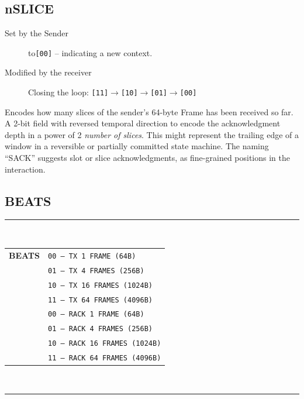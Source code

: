 \documentclass[../HFT-main.tex]{subfiles}
\begin{document}
\subsection{nSLICE}

\begin{description}
\item [Set by the Sender] to\texttt{[00]} --  indicating a  new context.
\item [Modified by the receiver] Closing the loop: \texttt{[11]$\rightarrow$[10]$\rightarrow$[01]$\rightarrow$[00]} %
\end{description}

Encodes how many slices of the sender’s 64-byte Frame has been received so far. A 2-bit field with reversed temporal direction to encode the acknowledgment depth in a power of 2 \emph{number of slices}. This might represent the trailing edge of a window in a reversible or partially committed state machine. The naming “SACK”  suggests  slot or slice acknowledgments, as fine-grained positions in the interaction. 


\subsection{BEATS}

\begin{margintable}
  \vspace{10pt} 
  \footnotesize
  \rule{5.4cm}{0.8pt}\\
  \begin{tabular}{@{}cl@{}}
    \textbf{BEATS} & \texttt{00 — TX 1 FRAME (64B)} \\
                   & \texttt{01 — TX 4 FRAMES (256B)} \\
                   & \texttt{10 — TX 16 FRAMES (1024B)} \\
                   & \texttt{11 — TX 64 FRAMES (4096B)} \\[3pt]
                   & \texttt{00 — RACK 1 FRAME (64B)} \\
                   & \texttt{01 — RACK 4 FRAMES (256B)} \\
                   & \texttt{10 — RACK 16 FRAMES (1024B)} \\
                   & \texttt{11 — RACK 64 FRAMES (4096B)} \\
  \end{tabular}\\
  \rule{5.4cm}{0.6pt}
\end{margintable}
\end{document}
